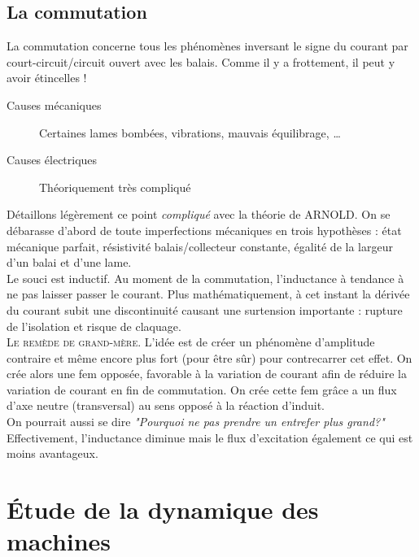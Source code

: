 	
	\subsection{La commutation}
	La commutation concerne tous les phénomènes inversant le signe du courant 
	par court-circuit/circuit ouvert avec les balais. Comme il y a frottement, 
	il peut y avoir étincelles !
	
	\begin{description}
	\item[Causes mécaniques] Certaines lames bombées, vibrations, mauvais 
	équilibrage, \dots
	\item[Causes électriques] Théoriquement très compliqué
	\end{description}
	Détaillons légèrement ce point \textit{compliqué} avec la théorie de ARNOLD. 
	On se débarasse d'abord de toute imperfections mécaniques en trois hypothèses :
	état mécanique parfait, résistivité balais/collecteur constante, égalité de 
	la largeur d'un balai et d'une lame.\\
	
	Le souci est inductif. Au moment de la commutation, l'inductance à tendance 
	à ne pas laisser passer le courant. Plus mathématiquement, à cet instant la 
	dérivée du courant subit une discontinuité causant une surtension importante : 
	rupture de l’isolation et risque de claquage.\\
	
	\textsc{Le remède de grand-mère}. L'idée est de créer un phénomène d'amplitude 
	contraire et même encore plus fort (pour être sûr) pour contrecarrer cet 
	effet. On crée alors une fem opposée, favorable à la variation de courant afin 
	de réduire la variation de courant en fin de commutation. On crée cette fem 
	grâce a un flux d'axe neutre (transversal) au sens opposé à la réaction d'induit.\\
	On pourrait aussi se dire \textit{"Pourquoi ne pas prendre un entrefer plus grand?"} 
	Effectivement, l'inductance diminue mais le flux d'excitation également ce qui 
	est moins avantageux.
		

\newpage
\section{Étude de la dynamique des machines}
